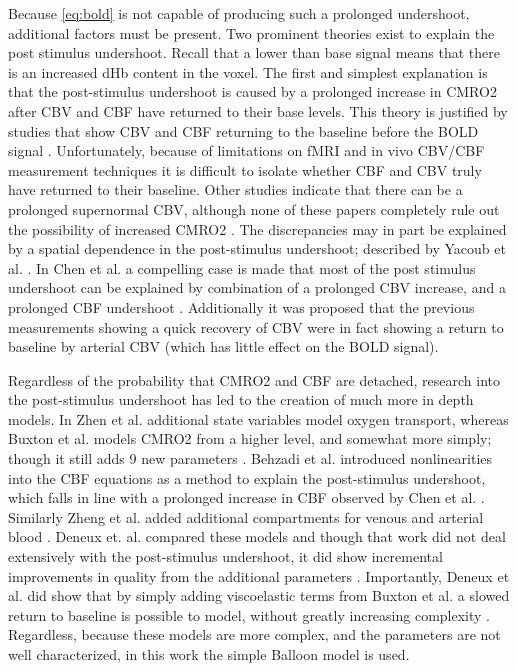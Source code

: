 Because \autoref{eq:bold} is not capable of producing such a prolonged undershoot,
additional factors must be present. Two prominent theories exist to explain the post 
stimulus undershoot.  Recall
that a lower than base signal means that there is an increased \ac{dHb}
content in the voxel. The first and simplest explanation is that the post-stimulus
undershoot is caused by a prolonged increase in \ac{CMRO2} after \ac{CBV} and \ac{CBF}
have returned to their base levels. This theory is justified by 
studies that show \ac{CBV} and \ac{CBF} returning to the baseline before the \ac{BOLD} signal
\cite{Frahm2008, Donahue2009, Buxton2004, Lu2004, Shen2008}. 
Unfortunately, because of limitations on \ac{fMRI} and in vivo
\ac{CBV}/\ac{CBF} measurement techniques it is difficult to isolate whether \ac{CBF} and
\ac{CBV} truly have returned to their baseline. Other studies indicate
that there can be a prolonged supernormal \ac{CBV}, although none of these papers completely
rule out the possibility of increased \ac{CMRO2}  \cite{Mandeville1999a,
Behzadi2005, Chen2009a}. The discrepancies may in part
be explained by a spatial dependence in the post-stimulus undershoot; described
by Yacoub et al. \cite{Yacoub2006}. In Chen et al. 
a compelling case is made that most of the post stimulus undershoot can be 
explained by combination of a prolonged \ac{CBV} increase, and a prolonged \ac{CBF} 
undershoot \cite{Chen2009}. Additionally it was proposed that
the previous measurements showing a quick recovery of \ac{CBV} 
were in fact showing a return to baseline by arterial \ac{CBV} (which
has little effect on the \ac{BOLD} signal).

Regardless of the probability that \ac{CMRO2} and \ac{CBF} are detached,
research into the post-stimulus undershoot has led to the creation
of much more in depth models. In Zhen et al. additional state
variables model oxygen transport, whereas Buxton et al. models
\ac{CMRO2} from a higher level, and somewhat more simply; though it 
still adds 9 new parameters \cite{Zheng2002, Buxton2004}. Behzadi et al. 
introduced nonlinearities into the \ac{CBF} equations as a method to
explain the post-stimulus undershoot, which falls in line with a 
prolonged increase in \ac{CBF} observed by Chen et al. \cite{Behzadi2005, Chen2009}. 
Similarly Zheng et al. added additional compartments for 
venous and arterial blood \cite{Zheng2005}. 
Deneux et. al. compared these models and though 
that work did not deal extensively with the 
post-stimulus undershoot, it did show incremental improvements
in quality from the additional parameters \cite{Deneux2006}.  
Importantly, Deneux et al. did show that by 
simply adding viscoelastic terms from Buxton et al. a slowed return 
to baseline is possible to model, without greatly increasing
complexity \cite{Deneux2006, Buxton2004}. Regardless, because these models are more 
complex, and the parameters are not well characterized, in this work the simple
Balloon model is used. 

